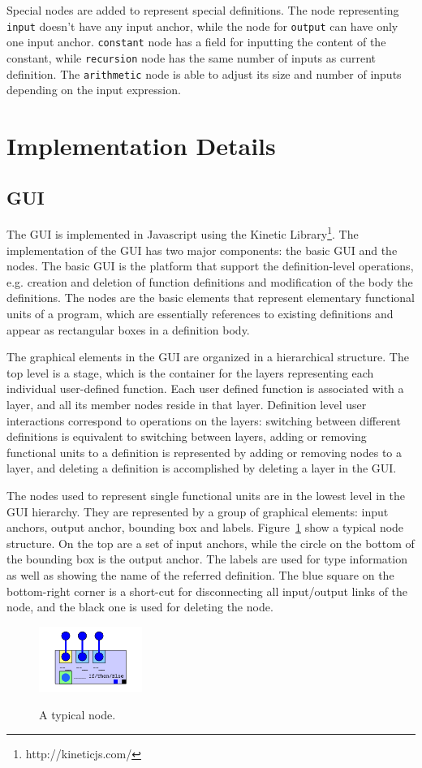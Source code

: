 \documentclass[12pt,UTF8,a4]{article}
\newcommand{\code}[1]{\texttt{#1}}
\begin{document}
Special nodes are added to represent special definitions. The node representing \code{input} doesn't have any input anchor, while the node for \code{output} can have only one input anchor. \code{constant} node has a field for inputting the content of the constant, while \code{recursion} node has the same number of inputs as current definition. The \code{arithmetic} node is able to adjust its size and number of inputs depending on the input expression.

\section{Implementation Details}
\subsection{GUI}
The GUI is implemented in Javascript using the Kinetic Library\footnote{http://kineticjs.com/}. The implementation of the GUI has two major components: the basic GUI and the nodes. The basic GUI is the platform that support the definition-level operations, e.g. creation and deletion of function definitions and modification of the body the definitions. The nodes are the basic elements that represent elementary functional units of a program, which are essentially references to existing definitions and appear as rectangular boxes in a definition body. 

The graphical elements in the GUI are organized in a hierarchical structure. The top level is a stage, which is the container for the layers representing each individual user-defined function. Each user defined function is associated with a layer, and all its member nodes reside in that layer. Definition level user interactions correspond to operations on the layers: switching between different definitions is equivalent to switching between layers, adding or removing functional units to a definition is represented by adding or removing nodes to a layer, and deleting a definition is accomplished by deleting a layer in the GUI.

The nodes used to represent single functional units are in the lowest level in the GUI hierarchy. They are represented by a group of graphical elements: input anchors, output anchor, bounding box and labels. Figure~\ref{fig:node} show a typical node structure. On the top are a set of input anchors, while the circle on the bottom of the bounding box is the output anchor. The labels are used for type information as well as showing the name of the referred definition. The blue square on the bottom-right corner is a short-cut for disconnecting all input/output links of the node, and the black one is used for deleting the node.
\begin{figure}[h]
\center
\includegraphics[width=0.3\textwidth]{./images/node} \\
\caption{A typical node.}\label{fig:node}
\end{figure}
\end{document}
